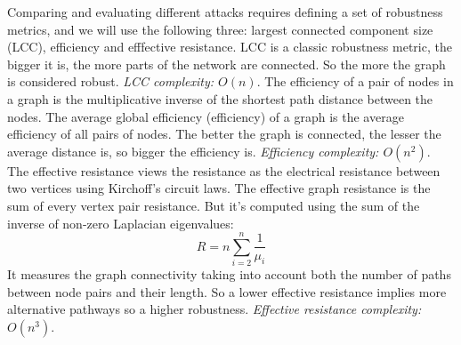 Comparing and evaluating different attacks requires defining a set of robustness metrics, and we will use the following three: largest connected component size (LCC), efficiency and efffective resistance. LCC is a classic robustness metric, the bigger it is, the more parts of the network are connected. So the more the graph is considered robust. \textit{LCC complexity: $O(n)$}. The efficiency of a pair of nodes in a graph is the multiplicative inverse of the shortest path distance between the nodes. The average global efficiency (efficiency) of a graph is the average efficiency of all pairs of nodes. The better the graph is connected, the lesser the average distance is, so bigger the efficiency is. \textit{Efficiency complexity: $O(n^2)$}. The effective resistance views the resistance as the electrical resistance between two vertices using Kirchoff's circuit laws. The effective graph resistance is the sum of every vertex pair resistance. But it's computed using the sum of the inverse of non-zero Laplacian eigenvalues:
    $$R = n \sum_{i=2}^n\frac{1}{\mu_i}$$
It measures the graph connectivity taking into account both the number of paths between node pairs and their length. So a lower effective resistance implies more alternative pathways so a higher robustness. \textit{Effective resistance complexity: $O(n^3)$}.